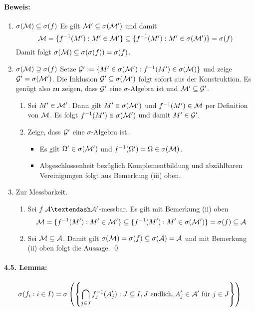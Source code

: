 \documentclass[12pt]{report}
\begin{document}
 \paragraph{Beweis:}
 \begin{enumerate}[label=\Roman*.]
     \item $\sigma(\mathcal{M})\subseteq\sigma(f)$\newline
     Es gilt $\mathcal{M}'\subseteq\sigma(\mathcal{M}')$ und damit 
     $$\mathcal{M}=\{f^{-1}(M'):M'\in\mathcal{M}'\}\subseteq\{f^{-1}(M'):M'\in\sigma(\mathcal{M}')\}=\sigma(f)$$
     Damit folgt $\sigma(\mathcal{M})\subseteq\sigma(\sigma(f))=\sigma(f)$.
     \item $\sigma(\mathcal{M})\supseteq\sigma(f)$\newline
     Setze $\mathcal{G}':=\{M'\in\sigma(\mathcal{M}'):f^{-1}(M')\in\sigma(\mathcal{M})\}$ und zeige $\mathcal{G}'=\sigma(\mathcal{M}')$. Die Inklusion $\mathcal{G}'\subseteq\nobreak\sigma(\mathcal{M}')$ folgt sofort aus der Konstruktion. Es gen\"ugt also zu zeigen, dass $\mathcal{G}'$ eine $\sigma$-Algebra ist und $\mathcal{M}'\subseteq\mathcal{G}'$.
     \begin{enumerate}[label=(\roman*)]
         \item Sei $M'\in\mathcal{M}'$. Dann gilt $M'\in\sigma(\mathcal{M}')$ und $f^{-1}(M')\in\mathcal{M}$ per Definition von $\mathcal{M}$. Es folgt $f^{-1}(M')\in\sigma(\mathcal{M}')$ und damit $M'\in\mathcal{G}'$.
         \item Zeige, dass $\mathcal{G}'$ eine $\sigma$-Algebra ist.
         \begin{itemize}
             \item Es gilt $\Omega'\in\sigma(\mathcal{M}')$ und $f^{-1}(\Omega')=\Omega\in\sigma(\mathcal{M})$.
             \item Abgeschlossenheit bez\"uglich Komplementbildung und abz\"ahlbaren Vereinigungen folgt aus Bemerkung (iii) oben.
         \end{itemize}
     \end{enumerate}
     \item Zur Messbarkeit.
     \begin{enumerate}[label=(\roman*)]
        \item Sei $f$ $\A\textendash\A'$-messbar. Es gilt mit Bemerkung (ii) oben
        $$\mathcal{M}=\{f^{-1}(M'):M'\in\mathcal{M}'\}\subseteq\{f^{-1}(M'):M'\in\sigma(\mathcal{M}')\}=\sigma(f)\subseteq\mathcal{A}$$
        \item Sei $\mathcal{M}\subseteq\mathcal{A}$. Damit gilt $\sigma(\mathcal{M})=\sigma(f)\subseteq\sigma(\mathcal{A})=\mathcal{A}$ und mit Bemerkung (ii) oben folgt die Aussage. \qed
     \end{enumerate}
 \end{enumerate}
 
 \paragraph{4.5. Lemma:}
 $$\sigma(f_i:i\in I)=\sigma\left(\left\{\bigcap_{j\in J}f_j^{-1}(A_j'):J\subseteq I, J\text{ endlich},A_j'\in\mathcal{A}'\text{ f\"ur }j\in J\right\}\right)$$
 
\end{document}
